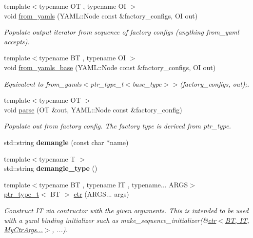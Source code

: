 \begin{DoxyCompactItemize}
{\footnotesize template$<$typename OT , typename OI $>$ }\\void \hyperlink{namespaceyadi_a5c72b55cccde908a9828431855e3b5e5}{from\+\_\+yamls} (Y\+A\+M\+L\+::\+Node const \&factory\+\_\+configs, OI out)
\begin{DoxyCompactList}\small\item\em Populate output iterator from sequence of factory configs (anything from\+\_\+yaml accepts). \end{DoxyCompactList}\item 
{\footnotesize template$<$typename BT , typename OI $>$ }\\void \hyperlink{namespaceyadi_a425268f5a35df74d449b5e1f44f39c22}{from\+\_\+yamls\+\_\+base} (Y\+A\+M\+L\+::\+Node const \&factory\+\_\+configs, OI out)
\begin{DoxyCompactList}\small\item\em Equivalent to from\+\_\+yamls$<$ptr\+\_\+type\+\_\+t$<$base\+\_\+type$>$$>$(factory\+\_\+configs, out);. \end{DoxyCompactList}\item 
{\footnotesize template$<$typename OT $>$ }\\void \hyperlink{namespaceyadi_ace9d761848d60ab00f257fdd9f5f2f21}{parse} (OT \&out, Y\+A\+M\+L\+::\+Node const \&factory\+\_\+config)
\begin{DoxyCompactList}\small\item\em Populate out from factory config. The factory type is derived from ptr\+\_\+type. \end{DoxyCompactList}\item 
\mbox{\label{namespaceyadi_af44c4b60a83f69f69789b994c8ebb0db}} 
std\+::string {\bfseries demangle} (const char $\ast$name)
\item 
\mbox{\label{namespaceyadi_a87df417ee34c190388417a55612ca14f}} 
{\footnotesize template$<$typename T $>$ }\\std\+::string {\bfseries demangle\+\_\+type} ()
\item 
{\footnotesize template$<$typename BT , typename IT , typename... A\+R\+GS$>$ }\\\hyperlink{namespaceyadi_a92290eb27cd90666aa87b17d854af9fe}{ptr\+\_\+type\+\_\+t}$<$ BT $>$ \hyperlink{namespaceyadi_a82056df230021b8fc8be27978644629d}{ctr} (A\+R\+G\+S... args)
\begin{DoxyCompactList}\small\item\em Construct IT via contructor with the given arguments. This is intended to be used with a yaml binding initializer such as make\+\_\+sequence\+\_\+initializer(\&\hyperlink{namespaceyadi_a82056df230021b8fc8be27978644629d}{ctr$<$\+B\+T, I\+T, My\+Ctr\+Args...$>$}, ...). \end{DoxyCompactList}\item 

\end{DoxyCompactItemize}
